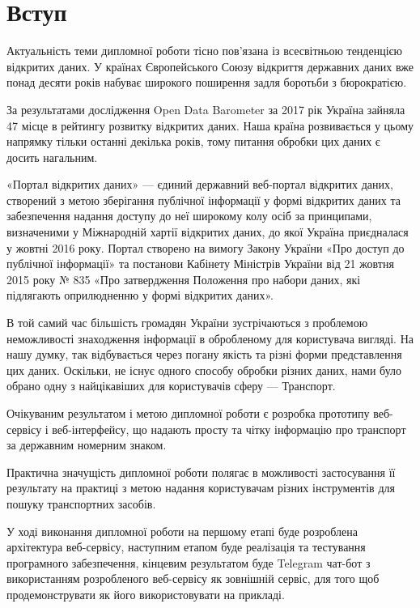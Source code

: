 \chapter*{Вступ}

Актуальність теми дипломної роботи тісно пов'язана із всесвітньою тенденцією відкритих даних. У країнах Європейського Союзу відкриття державних даних вже понад десяти років набуває широкого поширення задля боротьби з бюрократією.

За результатами дослідження Open Data Barometer за 2017 рік Україна зайняла 47 місце в рейтингу розвитку відкритих даних. Наша країна розвивається у цьому напрямку тільки останні декілька років, тому питання обробки цих даних є досить нагальним.

«Портал відкритих даних» — єдиний державний веб-портал відкритих даних, створений з метою зберігання публічної інформації у формі відкритих даних та забезпечення надання доступу до неї широкому колу осіб за принципами, визначеними у Міжнародній хартії відкритих даних, до якої Україна приєдналася у жовтні 2016 року. Портал створено на вимогу Закону України «Про доступ до публічної інформації» та постанови Кабінету Міністрів України від 21 жовтня 2015 року № 835 «Про затвердження Положення про набори даних, які підлягають оприлюдненню у формі відкритих даних».

В той самий час більшість громадян України зустрічаються з проблемою неможливості знаходження інформації в обробленому для користувача вигляді. На нашу думку, так відбувається через погану якість та різні форми представлення цих даних. Оскільки, не існує одного способу обробки різних даних, нами було обрано одну з найцікавіших для користувачів сферу — Транспорт.

Очікуваним результатом і метою дипломної роботи є розробка прототипу веб-сервісу і веб-інтерфейсу, що надають просту та чітку інформацію про транспорт за державним номерним знаком.

Практична значущість дипломної роботи полягає в можливості застосування її результату на практиці з метою надання користувачам різних інструментів для пошуку транспортних засобів.

У ході виконання дипломної роботи на першому етапі буде розроблена архітектура веб-сервісу, наступним етапом буде реалізація та тестування програмного забезпечення, кінцевим результатом буде Telegram чат-бот з використанням розробленого веб-сервісу як зовнішній сервіс, для того щоб продемонструвати як його використовувати на прикладі.
